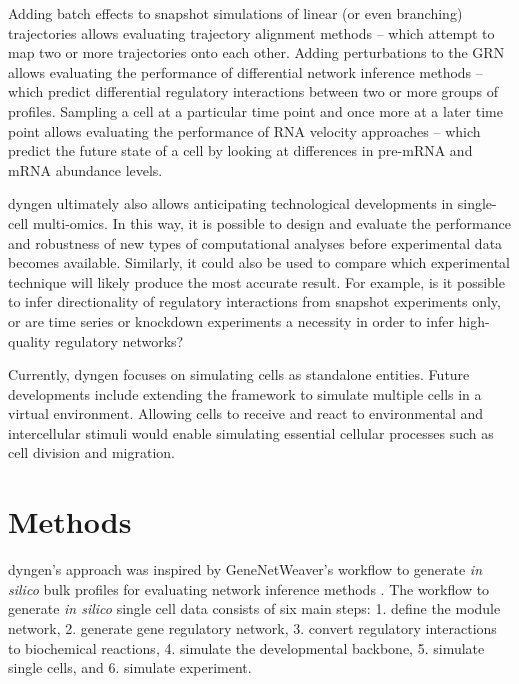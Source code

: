 Adding batch effects to snapshot simulations of linear (or even branching) trajectories allows evaluating trajectory alignment methods -- which attempt to map two or more trajectories onto each other. Adding perturbations to the GRN allows evaluating the performance of differential network inference methods -- which predict differential regulatory interactions between two or more groups of profiles.  Sampling a cell at a particular time point and once more at a later time point allows evaluating the performance of RNA velocity approaches -- which predict the future state of a cell by looking at differences in pre-mRNA and mRNA abundance levels.

dyngen ultimately also allows anticipating technological developments in single-cell multi-omics. In this way, it is possible to design and evaluate the performance and robustness of new types of computational analyses before experimental data becomes available.
Similarly, it could also be used to compare which experimental technique will likely produce the most accurate result. For example, is it possible to infer directionality of regulatory interactions from snapshot experiments only, or are time series or knockdown experiments a necessity in order to infer high-quality regulatory networks?

Currently, dyngen focuses on simulating cells as standalone entities.
Future developments include extending the framework to simulate multiple cells in a virtual environment. Allowing cells to receive and react to environmental and intercellular stimuli would enable simulating essential cellular processes such as cell division and migration. 
\section{Methods}

dyngen's approach was inspired by GeneNetWeaver's \cite{schaffter_genenetweaversilicobenchmark_2011} workflow to generate \textit{in silico} bulk profiles for evaluating network inference methods \cite{marbach_wisdomcrowdsrobust_2012}. The workflow to generate \textit{in silico} single cell data consists of six main steps: 1. define the module network, 2. generate gene regulatory network, 3. convert regulatory interactions to biochemical reactions, 4. simulate the developmental backbone, 5. simulate single cells, and 6. simulate experiment. 

